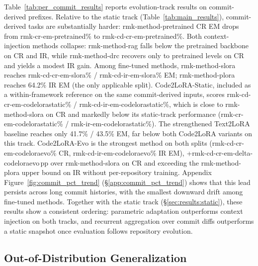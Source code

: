 \documentclass[11pt]{article}
\newcommand{\UseMacro}[1]{\csname rmk-#1\endcsname}
\newcommand{\codelora}{Code2LoRA\xspace}
\newcommand{\codelorastatic}{\codelora-Static\xspace}
\newcommand{\codeloraevo}{\codelora-Evo\xspace}
\newcommand{\textlora}{Text2LoRA\xspace}
\begin{document}
Table~\ref{tab:per_commit_results} reports evolution-track results on commit-derived prefixes.
Relative to the static track (Table~\ref{tab:main_results}), commit-derived tasks are substantially harder: \UseMacro{method-pretrained} CR EM drops from \UseMacro{cr-em-pretrained}\% to \UseMacro{cd-cr-em-pretrained}\%.
Both context-injection methods collapse: \UseMacro{method-rag} falls below the pretrained backbone on CR and IR, while \UseMacro{method-drc} recovers only to pretrained levels on CR and yields a modest IR gain.
Among fine-tuned methods, \UseMacro{method-slora} reaches \UseMacro{cd-cr-em-slora}\% / \UseMacro{cd-ir-em-slora}\% EM; \UseMacro{method-plora} reaches 64.2\% IR EM (the only applicable split).
\codelorastatic{}, included as a within-framework reference on the same commit-derived inputs, scores \UseMacro{cd-cr-em-codelorastatic}\% / \UseMacro{cd-ir-em-codelorastatic}\%, which is close to \UseMacro{method-slora} on CR and markedly below its static-track performance (\UseMacro{cr-em-codelorastatic}\% / \UseMacro{ir-em-codelorastatic}\%). %
The strengthened \textlora{} baseline reaches only 41.7\% / 43.5\% EM, far below both \codelora{} variants on this track.
\codeloraevo{} is the strongest method on both splits (\UseMacro{cd-cr-em-codeloraevo}\% CR, \UseMacro{cd-ir-em-codeloraevo}\% IR EM), +\UseMacro{cd-cr-em-delta-codeloraevo}\,pp over \UseMacro{method-slora} on CR and exceeding the \UseMacro{method-plora} upper bound on IR without per-repository training.
Appendix Figure~\ref{fig:commit_pct_trend} (\S\ref{app:commit_pct_trend}) shows that this lead persists across long commit histories, with the smallest downward drift among fine-tuned methods.
Together with the static track (\S\ref{sec:results:static}), these results show a consistent ordering: parametric adaptation outperforms context injection on both tracks, and recurrent aggregation over commit diffs outperforms a static snapshot once evaluation follows repository evolution.

\subsection{Out-of-Distribution Generalization}
\label{sec:results:ood}
\end{document}
